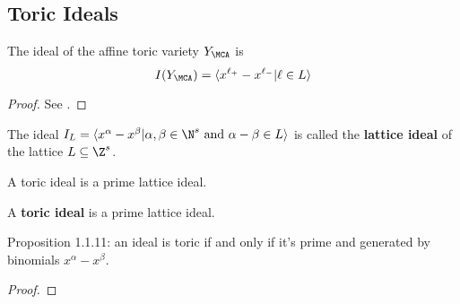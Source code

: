 \subsection{Toric Ideals}


\begin{proposition}
  \label{1-1-9-ideal-ya}

  The ideal of the affine toric variety $Y_\MCA$ is
  \[
    I(Y_\MCA) = \langle x^{\ell_+} - x^{\ell_-} | \ell \in L\rangle
  \]
\end{proposition}
\begin{proof}
  \uses{}

  See \cite{Cox_2011}.
\end{proof}


\begin{definition}
  \label{1-1-10-lattice-ideal}
  \uses{}
  \leanok

  The ideal $I_L = \langle x^\alpha - x^\beta | \alpha, \beta \in \N^s \text{ and } \alpha - \beta \in L\rangle$ is called the {\bf lattice ideal} of the lattice $L \subseteq \Z^s$.

  A toric ideal is a prime lattice ideal.
\end{definition}


\begin{definition}
  \label{1-1-10-toric-ideal}
  \leanok
  A {\bf toric ideal} is a prime lattice ideal.
\end{definition}


\begin{proposition}
  \label{1-1-11-toric-ideal-gen-binomial}

  Proposition 1.1.11: an ideal is toric if and only if it's prime and generated by binomials $x^\alpha - x^\beta$.
\end{proposition}
\begin{proof}

\end{proof}


